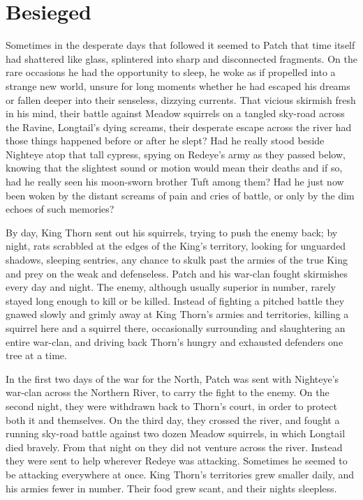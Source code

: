\documentclass[12pt]{book}
\begin{document}

\section{Besieged}

Sometimes in the desperate days that followed it seemed to Patch that time itself had shattered like glass, splintered into sharp and disconnected fragments. On the rare occasions he had the opportunity to sleep, he woke as if propelled into a strange new world, unsure for long moments whether he had escaped his dreams or fallen deeper into their senseless, dizzying currents. That vicious skirmish fresh in his mind, their battle against Meadow squirrels on a tangled sky-road across the Ravine, Longtail's dying screams, their desperate escape across the river %
had those things happened before or after he slept? Had he really stood beside Nighteye atop that tall cypress, spying on Redeye's army as they passed below, knowing that the slightest sound or motion would mean their deaths %
and if so, had he really seen his moon-sworn brother Tuft among them? Had he just now been woken by the distant screams of pain and cries of battle, or only by the dim echoes of such memories?

By day, King Thorn sent out his squirrels, trying to push the enemy back; by night, rats scrabbled at the edges of the King's territory, looking for unguarded shadows, sleeping sentries, any chance to skulk past the armies of the true King and prey on the weak and defenseless. Patch and his war-clan fought skirmishes every day and night. The enemy, although usually superior in number, rarely stayed long enough to kill or be killed. Instead of fighting a pitched battle they gnawed slowly and grimly away at King Thorn's armies and territories, killing a squirrel here and a squirrel there, occasionally surrounding and slaughtering an entire war-clan, and driving back Thorn's hungry and exhausted defenders one tree at a time.

In the first two days of the war for the North, Patch was sent with Nighteye's war-clan across the Northern River, to carry the fight to the enemy. On the second night, they were withdrawn back to Thorn's court, in order to protect both it and themselves. On the third day, they crossed the river, and fought a running sky-road battle against two dozen Meadow squirrels, in which Longtail died bravely. From that night on they did not venture across the river. Instead they were sent to help wherever Redeye was attacking. Sometimes he seemed to be attacking everywhere at once. King Thorn's territories grew smaller daily, and his armies fewer in number. Their food grew scant, and their nights sleepless.
\end{document}
